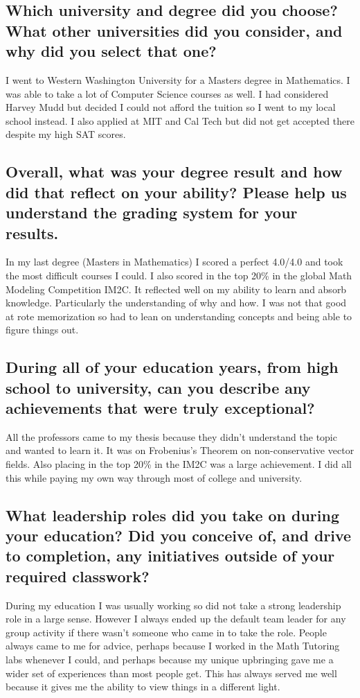 \documentclass[letter,12pt]{article}
\begin{document}
\subsection{Which university and degree did you choose? What other universities did you consider, and why did you select that one?}
I went to Western Washington University for a Masters degree in Mathematics. I was able to take a lot of Computer Science courses as well. I had considered Harvey Mudd but decided I could not afford the tuition so I went to my local school instead. I also applied at MIT and Cal Tech but did not get accepted there despite my high SAT scores.

\subsection{Overall, what was your degree result and how did that reflect on your ability? Please help us understand the grading system for your results.}
In my last degree (Masters in Mathematics) I scored a perfect 4.0/4.0 and took the most difficult courses I could. I also scored in the top 20\% in the global Math Modeling Competition IM2C. It reflected well on my ability to learn and absorb knowledge. Particularly the understanding of why and how. I was not that good at rote memorization so had to lean on understanding concepts and being able to figure things out.

\subsection{During all of your education years, from high school to university,  can you describe any achievements that were truly exceptional?}
All the professors came to my thesis because they didn't understand the topic and wanted to learn it. It was on Frobenius's Theorem on non-conservative vector fields. Also placing in the top 20\% in the IM2C was a large achievement. I did all this while paying my own way through most of college and university.

\subsection{What leadership roles did you take on during your education? Did you conceive of, and drive to completion, any initiatives outside of your required classwork?}
During my education I was usually working so did not take a strong leadership role in a large sense. However I always ended up the default team leader for any group activity if there wasn't someone who came in to take the role. People always came to me for advice, perhaps because I worked in the Math Tutoring labs whenever I could, and perhaps because my unique upbringing gave me a wider set of experiences than most people get. This has always served me well because it gives me the ability to view things in a different light.
\end{document}
